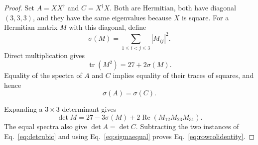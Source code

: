 \documentclass[10pt,a4paper]{amsart}
\newcommand{\RePart}{\operatorname{Re}}
\newcommand{\tr}{\operatorname{tr}}
\begin{document}
\begin{proof}
Set $A=XX^{\dagger}$ and $C=X^{\dagger}X$.  Both are Hermitian, both have diagonal $(3,3,3)$, and they have the same eigenvalues because $X$ is square. For a Hermitian matrix $M$ with this diagonal, define
\begin{equation}
\sigma(M)=\sum_{1\leq i<j\leq3}|M_{ij}|^2.
\label{eq:sigmam}
\end{equation}
Direct multiplication gives
\begin{equation}
\tr(M^2)=27+2\sigma(M).
\label{eq:tracem2}
\end{equation}
Equality of the spectra of $A$ and $C$ implies equality of their traces of squares, and hence
\begin{equation}
\sigma(A)=\sigma(C).
\label{eq:sigmaequal}
\end{equation}

Expanding a $3\times3$ determinant gives
\begin{equation}
\det M=27-3\sigma(M)
+2\RePart\!\left(M_{12}M_{23}M_{31}\right).
\label{eq:detcubic}
\end{equation}
The equal spectra also give $\det A=\det C$.  Subtracting the two instances of Eq.~\eqref{eq:detcubic} and using Eq.~\eqref{eq:sigmaequal} proves Eq.~\eqref{eq:rowcolidentity}.
\end{proof}
\end{document}
